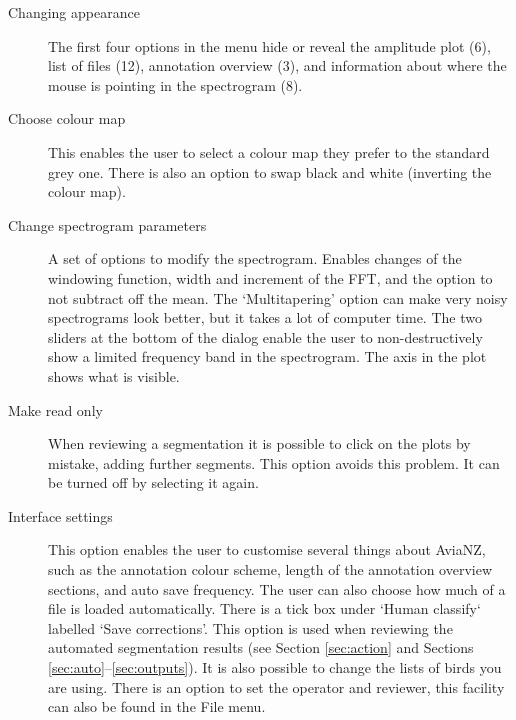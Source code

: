 \documentclass{article}
\begin{document}
\begin{description}
\item [Changing appearance] The first four options in the menu hide or reveal the amplitude plot (6), list of files (12), annotation overview (3), and information about where the mouse is pointing in the spectrogram (8). 
\item [Choose colour map] This enables the user to select a colour map they prefer to the standard grey one. There is also an option to swap black and white (inverting the colour map). 
\item [Change spectrogram parameters] A set of options to modify the spectrogram. Enables changes of the windowing function, width and increment of the FFT, and the option to not subtract off the mean. The `Multitapering' option can make very noisy spectrograms look better, but it takes a lot of computer time. The two sliders at the bottom of the dialog enable the user to non-destructively show a limited frequency band in the spectrogram. The axis in the plot shows what is visible. 
\item [Make read only] When reviewing a segmentation it is possible to click on the plots by mistake, adding further segments. This option avoids this problem. It can be turned off by selecting it again. 
\item [Interface settings] This option enables the user to customise several things about AviaNZ, such as the annotation colour scheme, length of the annotation overview sections, and auto save frequency. The user can also choose how much of a file is loaded automatically. There is a tick box under `Human classify` labelled `Save corrections'. This option is used when reviewing the automated segmentation results  (see Section \ref{sec:action} and Sections \ref{sec:auto}--\ref{sec:outputs}). It is also possible to change the lists of birds you are using. 
There is an option to set the operator and reviewer, this facility can also be found in the File menu.
\end{description}
\end{document}
